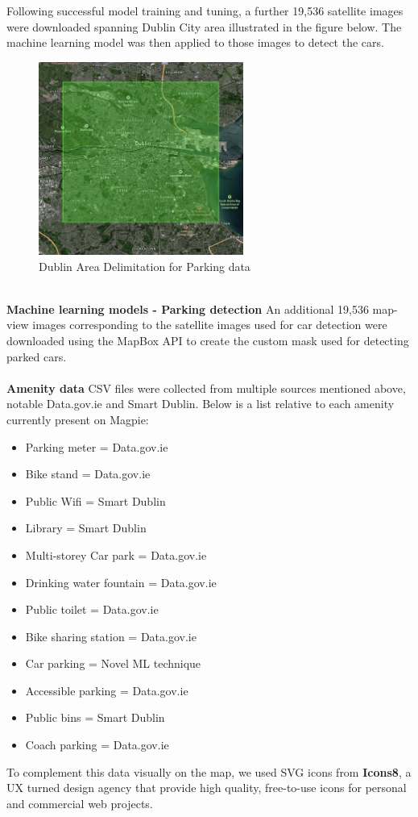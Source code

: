 Following successful model training and tuning, a further 19,536 satellite images were downloaded spanning Dublin City area illustrated in the figure below. The machine learning model was then applied to those images to detect the cars.
\begin{figure}[h!]
    \centering
    \includegraphics[width=0.6\textwidth]{images/dublin-img-area.jpg}
    \caption{Dublin Area Delimitation for Parking data}
\end{figure}\\

\textbf{Machine learning models - Parking detection}
An additional 19,536 map-view images corresponding to the satellite images used for car detection were downloaded using the MapBox API to create the custom mask used for detecting parked cars.\\ \\

\textbf{Amenity data}
CSV files were collected from multiple sources mentioned above, notable Data.gov.ie and Smart Dublin. Below is a list relative to each amenity currently present on Magpie:
\begin{itemize}
    \item Parking meter = Data.gov.ie
    \item Bike stand = Data.gov.ie
    \item Public Wifi = Smart Dublin
    \item Library = Smart Dublin
    \item Multi-storey Car park = Data.gov.ie
    \item Drinking water fountain = Data.gov.ie
    \item Public toilet = Data.gov.ie
    \item Bike sharing station = Data.gov.ie
    \item Car parking = Novel ML technique
    \item Accessible parking = Data.gov.ie
    \item Public bins = Smart Dublin
    \item Coach parking = Data.gov.ie
\end{itemize}
To complement this data visually on the map, we used SVG icons from \textbf{Icons8}, a UX turned design agency that provide high quality, free-to-use icons for personal and commercial web projects.\\

